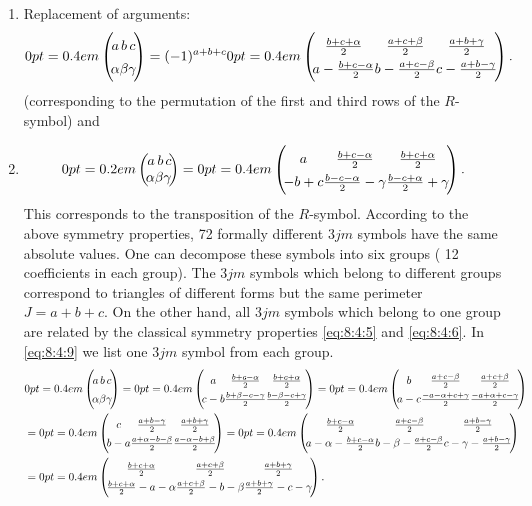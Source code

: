 \begin{enumerate}[label=(\roman*)]
\subsubsection{Regge symmetries \cite{ref094}}
\item Replacement of arguments:
\begin{equation}
\threej[c]{a}{b}{c}{\alpha}{\beta}{\gamma}=(-1)^{a+b+c}\threej[c]{\frac{b+c+\alpha}{2}}{\frac{a+c+\beta}{2}}{\frac{a+b+\gamma}{2}}{a-\frac{b+c-\alpha}{2}}{b-\frac{a+c-\beta}{2}}{c-\frac{a+b-\gamma}{2}}. \label{eq:8:4:7}
\end{equation}
(corresponding to the permutation of the first and third rows of the $R$-symbol) and\\
\item
\begin{equation}
\threej{a}{b}{c}{\alpha}{\beta}{\gamma}=\threej[c]{a}{\frac{b+c-\alpha}{2}}{\frac{b+c+\alpha}{2}}{-b+c}{\frac{b-c-\alpha}{2}-\gamma}{\frac{b-c+\alpha}{2}+\gamma}. \label{eq:8:4:8}
\end{equation}
This corresponds to the transposition of the $R$-symbol. According to the above symmetry properties, 72 formally different $3 j m$ symbols have the same absolute values. One can decompose these symbols into six groups ( 12 coefficients in each group). The $3 j m$ symbols which belong to different groups correspond to triangles of different forms but the same perimeter $J=a+b+c$. On the other hand, all $3 j m$ symbols which belong to one group are related by the classical symmetry properties \eqref{eq:8:4:5} and \eqref{eq:8:4:6}. In \eqref{eq:8:4:9} we list one $3 j m$ symbol from each group.
\begin{align}
& \threej[c]{a}{b}{c}{\alpha}{\beta}{\gamma}=\threej[c]{a}{\frac{b+c-\alpha}{2}}{\frac{b+c+\alpha}{2}}{c-b}{\frac{b+\beta-c-\gamma}{2}}{\frac{b-\beta-c+\gamma}{2}}=\threej[c]{b}{\frac{a+c-\beta}{2}}{\frac{a+c+\beta}{2}}{a-c}{\frac{-a-\alpha+c+\gamma}{2}}{\frac{-a+\alpha+c-\gamma}{2}}  \notag\\
& =\threej[c]{c}{\frac{a+b-\gamma}{2}}{\frac{a+b+\gamma}{2}}{b-a}{\frac{a+\alpha-b-\beta}{2}}{\frac{a-\alpha-b+\beta}{2}}=\threej[c]{\frac{b+c-\alpha}{2}}{\frac{a+c-\beta}{2}}{\frac{a+b-\gamma}{2}}{a-\alpha-\frac{b+c-\alpha}{2}}{b-\beta-\frac{a+c-\beta}{2}}{c-\gamma-\frac{a+b-\gamma}{2}}  \notag\\
& =\threej[c]{\frac{b+c+\alpha}{2}}{\frac{a+c+\beta}{2}}{\frac{a+b+\gamma}{2}}%
{\frac{b+c+\alpha}{2}-a-\alpha}{\frac{a+c+\beta}{2}-b-\beta}{\frac{a+b+\gamma}{2}-c-\gamma}
 . \label{eq:8:4:9}
\end{align}
\end{enumerate}
